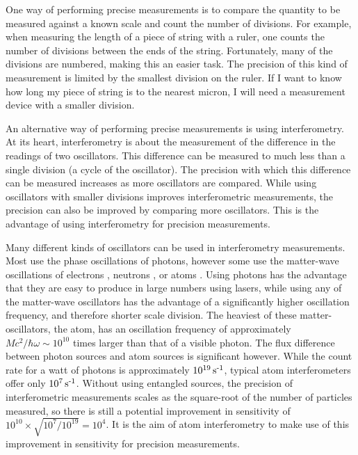 One way of performing precise measurements is to compare the quantity to be measured against a known scale and count the number of divisions.  For example, when measuring the length of a piece of string with a ruler, one counts the number of divisions between the ends of the string.  Fortunately, many of the divisions are numbered, making this an easier task.  The precision of this kind of measurement is limited by the smallest division on the ruler.  If I want to know how long my piece of string is to the nearest micron, I will need a measurement device with a smaller division.

An alternative way of performing precise measurements is using interferometry.  At its heart, interferometry is about the measurement of the difference in the readings of two oscillators.  This difference can be measured to much less than a single division (a cycle of the oscillator).  The precision with which this difference can be measured increases as more oscillators are compared.  While using oscillators with smaller divisions improves interferometric measurements, the precision can also be improved by comparing more oscillators.  This is the advantage of using interferometry for precision measurements.

Many different kinds of oscillators can be used in interferometry measurements.  Most use the phase oscillations of photons, however some use the matter-wave oscillations of electrons \citep{Missiroli:1981}, neutrons \citep{Rauch:1974}, or atoms \citep{Keith:1991,Carnal:1991,Riehle:1991,Kasevich:1991}.  Using photons has the advantage that they are easy to produce in large numbers using lasers, while using any of the matter-wave oscillators has the advantage of a significantly higher oscillation frequency, and therefore shorter scale division.  The heaviest of these matter-oscillators, the atom, has an oscillation frequency of approximately $M c^2 / \hbar \omega \sim 10^{10}$ times larger than that of a visible photon.  The flux difference between photon sources and atom sources is significant however.  While the count rate for a watt of photons is approximately $\unit[10^{19}]{s\textsuperscript{-1}}$, typical atom interferometers offer only $\unit[10^{7}]{s\textsuperscript{-1}}$.  Without using entangled sources, the precision of interferometric measurements scales as the square-root of the number of particles measured, so there is still a potential improvement in sensitivity of $10^{10} \times \sqrt{10^7/10^{19}} = 10^4$.  It is the aim of atom interferometry to make use of this improvement in sensitivity for precision measurements.

